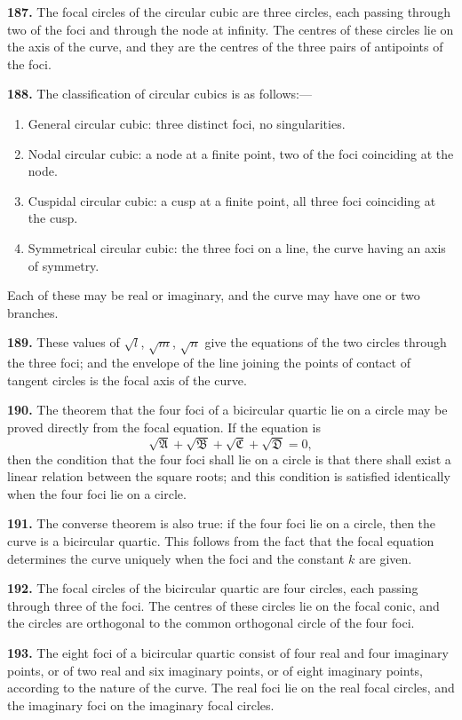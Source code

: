 \documentclass[12pt,a4paper]{article}
\theoremstyle{definition}
\begin{document}
\noindent\textbf{187.} The focal circles of the circular cubic are three circles, each passing
through two of the foci and through the node at infinity. The centres of these circles
lie on the axis of the curve, and they are the centres of the three pairs of antipoints
of the foci.

\noindent\textbf{188.} The classification of circular cubics is as follows:---
\begin{enumerate}[label=(\arabic*)]
\item General circular cubic: three distinct foci, no singularities.
\item Nodal circular cubic: a node at a finite point, two of the foci coinciding at the node.
\item Cuspidal circular cubic: a cusp at a finite point, all three foci coinciding at the cusp.
\item Symmetrical circular cubic: the three foci on a line, the curve having an axis of symmetry.
\end{enumerate}
Each of these may be real or imaginary, and the curve may have one or two branches.

\noindent\textbf{189.} These values of $\sqrt{l}$, $\sqrt{m}$, $\sqrt{n}$ give the equations of the two circles
through the three foci; and the envelope of the line joining the points of contact of
tangent circles is the focal axis of the curve.

\newpage
\noindent\textbf{190.} The theorem that the four foci of a bicircular quartic lie on a circle
may be proved directly from the focal equation. If the equation is
\[
\sqrt{\mathfrak{A}} + \sqrt{\mathfrak{B}} + \sqrt{\mathfrak{C}} + \sqrt{\mathfrak{D}} = 0,
\]
then the condition that the four foci shall lie on a circle is that there shall exist a
linear relation between the square roots; and this condition is satisfied identically
when the four foci lie on a circle.

\noindent\textbf{191.} The converse theorem is also true: if the four foci lie on a circle, then
the curve is a bicircular quartic. This follows from the fact that the focal equation
determines the curve uniquely when the foci and the constant $k$ are given.

\noindent\textbf{192.} The focal circles of the bicircular quartic are four circles, each passing
through three of the foci. The centres of these circles lie on the focal conic, and the
circles are orthogonal to the common orthogonal circle of the four foci.

\noindent\textbf{193.} The eight foci of a bicircular quartic consist of four real and four imaginary
points, or of two real and six imaginary points, or of eight imaginary points, according
to the nature of the curve. The real foci lie on the real focal circles, and the imaginary
foci on the imaginary focal circles.
\end{document}
